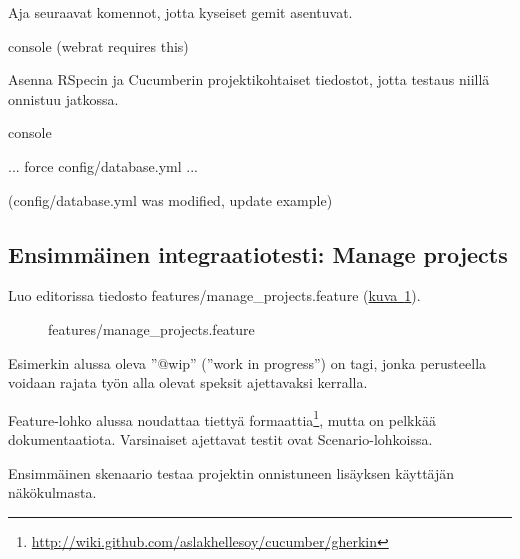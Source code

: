 \documentclass{article}
\newenvironment{myfigure}{
  \begin{figure}
    \centering
    \begin{lrbox}{\myfigurebox}
      \begin{minipage}{0.8\textwidth}
}{
      \end{minipage}
    \end{lrbox}
    \fcolorbox{blue}{blue!1}{\usebox{\myfigurebox}}
  \end{figure}
}
\newcommand{\myref}[2]{\hyperref[#2]{#1~\ref*{#2}}}
\newcommand{\pdfforeignlanguage}[2]{\texorpdfstring{\foreignlanguage{#1}{#2}}{#2}}
\newcommand{\eng}[1]{\pdfforeignlanguage{english}{#1}}
\begin{document}
\begin{samepage}
Aja seuraavat komennot, jotta kyseiset gemit asentuvat.

\begin{pygmented}{console}
(webrat requires this)

\end{pygmented}
\end{samepage}

\begin{samepage}
Asenna RSpecin ja Cucumberin projektikohtaiset tiedostot, jotta testaus niillä
onnistuu jatkossa.

\begin{pygmented}{console}

...
       force  config/database.yml
...

(config/database.yml was modified, update example)

\end{pygmented}
\end{samepage}

\subsection{Ensimmäinen integraatiotesti: \eng{Manage projects}}

Luo editorissa tiedosto features/manage\_projects.feature
(\myref{kuva}{fig:manage-projects-feature}).

\begin{myfigure}
\caption{features/manage\_projects.feature}
\label{fig:manage-projects-feature}
\end{myfigure}

Esimerkin alussa oleva ''@wip'' (''\eng{work in progress}'') on tagi, jonka
perusteella voidaan rajata työn alla olevat speksit ajettavaksi kerralla.

\eng{Feature}-lohko alussa noudattaa tiettyä
formaattia\footnote{\url{http://wiki.github.com/aslakhellesoy/cucumber/gherkin}},
mutta on pelkkää dokumentaatiota. Varsinaiset ajettavat testit ovat
\eng{Scenario}-lohkoissa.

Ensimmäinen skenaario testaa projektin onnistuneen lisäyksen käyttäjän
näkökulmasta.
\end{document}
